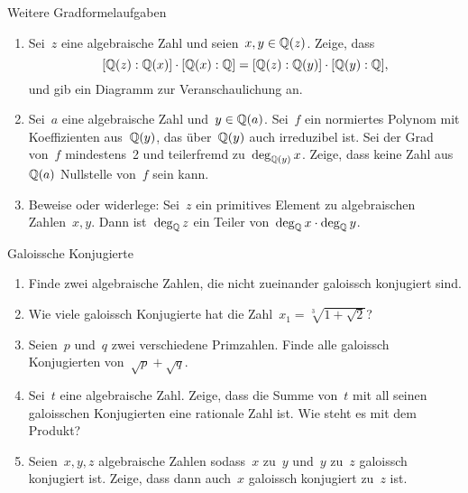 \documentclass{algblatt}
\begin{document}
\vspace*{-1.5cm}


\begin{aufgabe}{Weitere Gradformelaufgaben}
\begin{enumerate}
\item Sei~$z$ eine algebraische Zahl und seien~$x, y \in \mathbb{Q}(z)$. Zeige, dass
\[ [\mathbb{Q}(z):\mathbb{Q}(x)] \cdot [\mathbb{Q}(x):\mathbb{Q}] = [\mathbb{Q}(z):\mathbb{Q}(y)] \cdot
[\mathbb{Q}(y):\mathbb{Q}], \]
und gib ein Diagramm zur Veranschaulichung an.
\item Sei~$a$ eine algebraische Zahl und~$y \in \mathbb{Q}(a)$. Sei~$f$ ein normiertes
Polynom mit Koeffizienten aus~$\mathbb{Q}(y)$, das über~$\mathbb{Q}(y)$
auch irreduzibel ist. Sei der Grad von~$f$ mindestens~2 und teilerfremd
zu~$\deg_{\mathbb{Q}(y)} x$. Zeige, dass keine Zahl aus~$\mathbb{Q}(a)$ Nullstelle von~$f$
sein kann.

\item Beweise oder widerlege: Sei~$z$ ein primitives Element zu algebraischen
Zahlen~$x, y$. Dann ist~$\deg_{\mathbb{Q}} z$ ein Teiler von~$\deg_{\mathbb{Q}} x \cdot \deg_{\mathbb{Q}}
y$.
\end{enumerate}
\end{aufgabe}

\begin{aufgabe}{Galoissche Konjugierte}
\begin{enumerate}
\item Finde zwei algebraische Zahlen, die nicht zueinander galoissch konjugiert
sind.
\item Wie viele galoissch Konjugierte hat die Zahl~$x_1 = \sqrt[3]{1 +
\sqrt{2}}$?
\item Seien~$p$ und~$q$ zwei verschiedene Primzahlen. Finde alle galoissch
Konjugierten von~$\sqrt{p} + \sqrt{q}$.
\item Sei~$t$ eine algebraische Zahl. Zeige, dass die Summe von~$t$ mit all
seinen galoisschen Konjugierten eine rationale Zahl ist. Wie steht es mit dem
Produkt?
\item Seien~$x, y, z$ algebraische Zahlen sodass~$x$ zu~$y$ und~$y$ zu~$z$
galoissch konjugiert ist. Zeige, dass dann auch~$x$ galoissch konjugiert zu~$z$
ist.
\end{enumerate}
\end{aufgabe}
\end{document}
